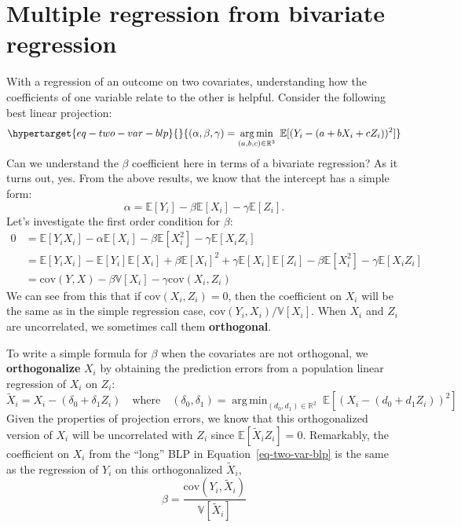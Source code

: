 \documentclass[
  letterpaper,
  DIV=11,
  numbers=noendperiod]{scrreprt}
\newcommand{\E}{\mathbb{E}}
\newcommand{\V}{\mathbb{V}}
\newcommand{\cov}{\text{cov}}
\DeclareMathOperator*{\argmin}{arg\,min}
\theoremstyle{plain}
\theoremstyle{definition}
\theoremstyle{definition}
\theoremstyle{remark}
\begin{document}
\hypertarget{sec-fwl}{%
\section{Multiple regression from bivariate regression}\label{sec-fwl}}

With a regression of an outcome on two covariates, understanding how the
coefficients of one variable relate to the other is helpful. Consider
the following best linear projection:
\begin{equation}\protect\hypertarget{eq-two-var-blp}{}{ 
(\alpha, \beta, \gamma) = \argmin_{(a,b,c) \in \mathbb{R}^{3}} \; \E[(Y_{i} - (a + bX_{i} + cZ_{i}))^{2}]
}\label{eq-two-var-blp}\end{equation} Can we understand the \(\beta\)
coefficient here in terms of a bivariate regression? As it turns out,
yes. From the above results, we know that the intercept has a simple
form: \[
\alpha = \E[Y_i] - \beta\E[X_i] - \gamma\E[Z_i].
\] Let's investigate the first order condition for \(\beta\): \[ 
\begin{aligned}
  0 &= \E[Y_{i}X_{i}] - \alpha\E[X_{i}] - \beta\E[X_{i}^{2}] - \gamma\E[X_{i}Z_{i}] \\
    &= \E[Y_{i}X_{i}] - \E[Y_{i}]\E[X_{i}] + \beta\E[X_{i}]^{2} + \gamma\E[X_{i}]\E[Z_{i}] - \beta\E[X_{i}^{2}] - \gamma\E[X_{i}Z_{i}] \\
  &= \cov(Y, X) - \beta\V[X_{i}] - \gamma \cov(X_{i}, Z_{i})
\end{aligned}
\] We can see from this that if \(\cov(X_{i}, Z_{i}) = 0\), then the
coefficient on \(X_i\) will be the same as in the simple regression
case, \(\cov(Y_{i}, X_{i})/\V[X_{i}]\). When \(X_i\) and \(Z_i\) are
uncorrelated, we sometimes call them \textbf{orthogonal}.

To write a simple formula for \(\beta\) when the covariates are not
orthogonal, we \textbf{orthogonalize} \(X_i\) by obtaining the
prediction errors from a population linear regression of \(X_i\) on
\(Z_i\): \[ 
\widetilde{X}_{i} = X_{i} - (\delta_{0} + \delta_{1}Z_{i}) \quad\text{where}\quad (\delta_{0}, \delta_{1}) = \argmin_{(d_{0},d_{1}) \in \mathbb{R}^{2}} \; \E[(X_{i} - (d_{0} + d_{1}Z_{i}))^{2}]
\] Given the properties of projection errors, we know that this
orthogonalized version of \(X_{i}\) will be uncorrelated with \(Z_{i}\)
since \(\E[\widetilde{X}_{i}Z_{i}] = 0\). Remarkably, the coefficient on
\(X_i\) from the ``long'' BLP in Equation~\ref{eq-two-var-blp} is the
same as the regression of \(Y_i\) on this orthogonalized
\(\widetilde{X}_i\), \[ 
\beta = \frac{\text{cov}(Y_{i}, \widetilde{X}_{i})}{\V[\widetilde{X}_{i}]}
\]
\end{document}
